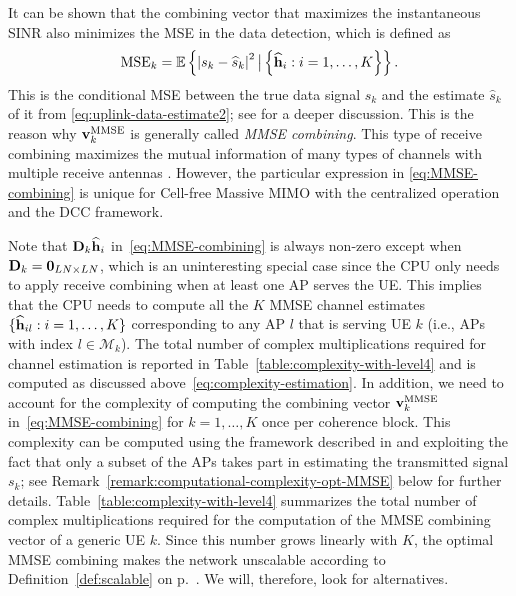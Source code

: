 It can be shown that the combining vector that maximizes the instantaneous SINR also minimizes the \gls{MSE} in the data detection, which is defined as 
\begin{align}{\rm{MSE}}_k = \mathbb{E} \left\{ \left| s_{k} - \widehat s_{k} \right |^2  \big| \left\{ \widehat{\mathbf{h}}_{i} : i=1,\ldots,K \right\}  \right\}.
\end{align}
This is the conditional MSE between the true data signal $s_k$ and the estimate  $\widehat s_{k} $ of it from \eqref{eq:uplink-data-estimate2}; see \cite[Sec.~4.1]{massivemimobook} for a deeper discussion. This is the reason why $\mathbf{v}_{k}^{{\rm MMSE}}$ is generally called \emph{MMSE combining}. This type of receive combining maximizes the mutual information of many types of channels with multiple receive antennas \cite{Park2013a}. However, the particular expression in \eqref{eq:MMSE-combining} is unique for Cell-free Massive MIMO with the centralized operation and the \gls{DCC} framework.

\enlargethispage{\baselineskip} 

 Note that $ \mathbf{{D}}_{k}\widehat{\mathbf{h}}_{i}$ in~\eqref{eq:MMSE-combining} is always non-zero except  when $ \mathbf{D}_{k}=\mathbf{0}_{LN \times LN}$, which is an uninteresting special case since the CPU only needs to apply receive combining when at least one AP serves the UE.
This implies that the CPU needs to compute all the $K$ MMSE channel estimates $\{\widehat{\mathbf{h}}_{il}: i =1,\ldots,K\}$ corresponding to any AP $l$ that is serving UE $k$ (i.e., APs with index $l\in \mathcal{M}_k$). The total number of complex multiplications required for channel estimation is reported in Table~\ref{table:complexity-with-level4} and is computed as discussed above~\eqref{eq:complexity-estimation}. In addition, we need to account for the complexity of computing the combining vector $\mathbf{v}_{k}^{{\rm MMSE}}$ in~\eqref{eq:MMSE-combining} for $k=1,\ldots,K$ once per coherence block. This complexity can be computed using the framework described in \cite[App.~B.1.1]{massivemimobook} and exploiting the fact that only a subset of the APs takes part in estimating the transmitted signal $s_k$; see Remark~\ref{remark:computational-complexity-opt-MMSE} below for further details. Table~\ref{table:complexity-with-level4} summarizes the total number of complex multiplications required for the computation of the MMSE combining vector of a generic UE $k$. Since this number grows linearly with $K$, the optimal MMSE combining makes the network unscalable according to Definition~\ref{def:scalable} on p.~\pageref{def:scalable}. We will, therefore, look for alternatives.


